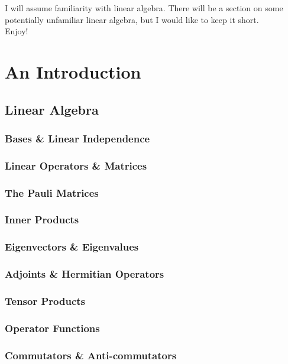 \documentclass{book}
\theoremstyle{definition}
\begin{document}
I will assume familiarity with linear algebra. There will be a section on some potentially unfamiliar linear algebra, but I would like to keep it short.\\

Enjoy!

\newpage
\tableofcontents
\newpage



\chapter{An Introduction}

\newpage


\section{Linear Algebra}

\subsection{Bases \& Linear Independence}
\subsection{Linear Operators \& Matrices}
\subsection{The Pauli Matrices}
\subsection{Inner Products}
\subsection{Eigenvectors \& Eigenvalues}
\subsection{Adjoints \& Hermitian Operators}
\subsection{Tensor Products}
\subsection{Operator Functions}
\subsection{Commutators \& Anti-commutators}
\end{document}
